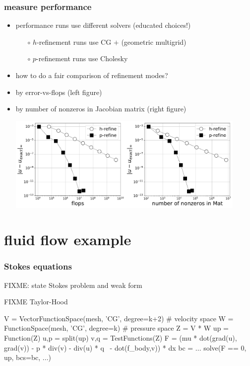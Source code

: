 \documentclass[hide notes,intlimits,usenames,dvipsnames]{beamer}
\begin{document}
\begin{frame}[fragile]
\frametitle{measure performance}
\begin{itemize}
\item performance runs use different solvers (educated choices!)
    \begin{itemize}
    \item[$\circ$] $h$-refinement runs use CG $+$ (geometric multigrid)
    \item[$\circ$] $p$-refinement runs use Cholesky
    \end{itemize}
\item how to do a fair comparison of refinement modes?
\item by error-vs-flops (left figure)
\item by number of nonzeros in Jacobian matrix (right figure)

\medskip
\mbox{\includegraphics[width=0.46\textwidth]{hprefine-Linf-flops}\quad\includegraphics[width=0.45\textwidth]{hprefine-Linf-nnz}}
\end{itemize}
\end{frame}


\section{fluid flow example}

\begin{frame}[fragile]
\frametitle{Stokes equations}

FIXME: state Stokes problem and weak form

FIXME Taylor-Hood

\begin{scode}
V = VectorFunctionSpace(mesh, 'CG', degree=k+2)  # velocity space
W = FunctionSpace(mesh, 'CG', degree=k)          # pressure space
Z = V * W
up = Function(Z)
u,p = split(up)
v,q = TestFunctions(Z)
F = (mu * dot(grad(u), grad(v)) - p * div(v) - div(u) * q \
     - dot(f_body,v)) * dx
bc = ...
solve(F == 0, up, bcs=bc, ...)
\end{scode}
\end{frame}
\end{document}

